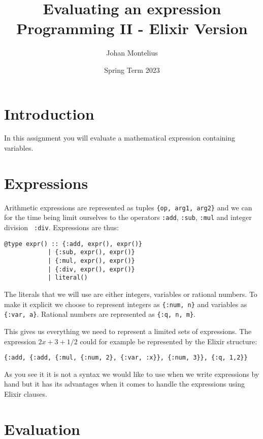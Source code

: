 \documentclass[a4paper,11pt]{article}
\begin{document}
\title{
    \textbf{Evaluating an expression}\\
    \large{Programming II - Elixir Version}
}
\author{Johan Montelius}
\date{Spring Term 2023}
\maketitle
{}


\section*{Introduction}

In this assignment you will evaluate a mathematical expression
containing variables.


\section*{Expressions}

Arithmetic expressions are represented as tuples {\tt \{op, arg1,
  arg2\}} and we can for the time being limit ourselves to the
operators {\tt :add}, {\tt :sub}, {\tt :mul} and integer division {\tt
  :div}.  Expressions are thus:

\begin{verbatim}
@type expr() :: {:add, expr(), expr()} 
            | {:sub, expr(), expr()} 
            | {:mul, expr(), expr()}
            | {:div, expr(), expr()}             
            | literal()
\end{verbatim}

The literals that we will use are either integers, variables or rational numbers. To
make it explicit we choose to represent integers as {\tt \{:num, n\}}
and variables as {\tt \{:var, a\}}. Rational numbers are represented as {\tt \{:q, n, m\}}.

This gives us everything we need to represent a limited sets of
expressions. The expression $2x + 3 + 1/2$ could for example be represented
by the Elixir structure:

\begin{verbatim}
{:add, {:add, {:mul, {:num, 2}, {:var, :x}}, {:num, 3}}, {:q, 1,2}}
\end{verbatim}

\noindent As you see it it is not a syntax we would like to use when we write
expressions by hand but it has its advantages when it comes to handle
the expressions using Elixir clauses. 

\section*{Evaluation}
\end{document}

